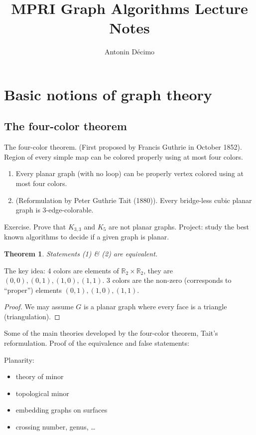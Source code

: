 \documentclass[12pt,a4paper]{article}
\title{MPRI Graph Algorithms Lecture Notes}
\author{Antonin Décimo}
\def\Z{\mathbb{R}}
\newtheorem{theorem}{Theorem}
\begin{document}
\maketitle

\section{Basic notions of graph theory}

\subsection{The four-color theorem}
The four-color theorem. (First proposed by Francis Guthrie in October 1852).
Region of every simple map can be colored properly using at most four colors.

\begin{enumerate}
\item Every planar graph (with no loop) can be properly vertex colored using at
most four colors.
\item (Reformulation by Peter Guthrie Tait (1880)). Every bridge-less cubic
  planar graph is 3-edge-colorable.
\end{enumerate}

Exercise. Prove that \(K_{3,3}\) and \(K_5\) are not planar graphs.  Project:
study the best known algorithms to decide if a given graph is planar.

\begin{theorem}
  Statements (1) \& (2) are equivalent.
\end{theorem}

The key idea: 4 colors are elements of \(\Z_2 \times \Z_2\), they are
\((0, 0), (0, 1), (1, 0), (1, 1)\).  3 colors are the non-zero (corresponds to
\enquote{proper}) elements \((0, 1), (1, 0), (1, 1)\).

\begin{proof}
  We may assume \(G\) is a planar graph where every face is a triangle
  (triangulation).
\end{proof}

Some of the main theories developed by the four-color theorem, Tait's
reformulation. Proof of the equivalence and false statements:

Planarity:
\begin{itemize}
\item theory of minor
\item topological minor
\item embedding graphs on surfaces
\item crossing number, genus, …
\end{itemize}
\end{document}
